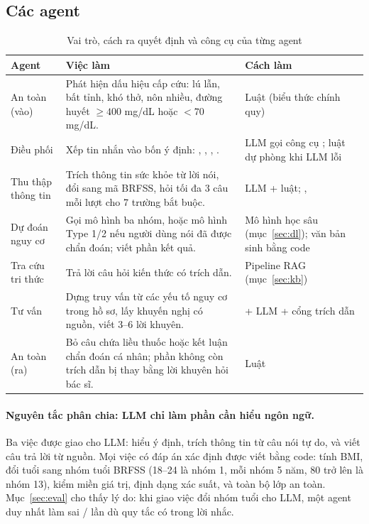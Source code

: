 \documentclass[11pt,a4paper]{article}
\begin{document}
\subsection{Các agent}

\begin{table}[H]
\centering
\caption{Vai trò, cách ra quyết định và công cụ của từng agent}
\begin{tabularx}{\linewidth}{L{2.4cm}YL{3.4cm}}
\toprule
Agent & Việc làm & Cách làm \\
\midrule
An toàn (vào) & Phát hiện dấu hiệu cấp cứu: lú lẫn, bất tỉnh, khó thở, nôn nhiều, đường huyết $\geq 400$ mg/dL hoặc $< 70$ mg/dL. & Luật (biểu thức chính quy) \\
Điều phối & Xếp tin nhắn vào bốn ý định: , , , . & LLM gọi công cụ ; luật dự phòng khi LLM lỗi \\
Thu thập thông tin & Trích thông tin sức khỏe từ lời nói, đổi sang mã BRFSS, hỏi tối đa 3 câu mỗi lượt cho 7 trường bắt buộc. & LLM  + luật; ,  \\
Dự đoán nguy cơ & Gọi mô hình ba nhóm, hoặc mô hình Type 1/2 nếu người dùng nói đã được chẩn đoán; viết phần kết quả. & Mô hình học sâu (mục~\ref{sec:dl}); văn bản sinh bằng code \\
Tra cứu tri thức & Trả lời câu hỏi kiến thức có trích dẫn. & Pipeline RAG (mục~\ref{sec:kb}) \\
Tư vấn & Dựng truy vấn từ các yếu tố nguy cơ trong hồ sơ, lấy khuyến nghị có nguồn, viết 3--6 lời khuyên. &  + LLM + cổng trích dẫn \\
An toàn (ra) & Bỏ câu chứa liều thuốc hoặc kết luận chẩn đoán cá nhân; phần không còn trích dẫn bị thay bằng lời khuyên hỏi bác sĩ. & Luật \\
\bottomrule
\end{tabularx}
\end{table}

\paragraph{Nguyên tắc phân chia: LLM chỉ làm phần cần hiểu ngôn ngữ.}
Ba việc được giao cho LLM: hiểu ý định, trích thông tin từ câu nói tự do, và viết câu trả lời từ nguồn. Mọi việc có đáp án
xác định được viết bằng code: tính BMI, đổi tuổi sang nhóm tuổi BRFSS (18--24 là nhóm 1, mỗi nhóm 5 năm, 80 trở lên là
nhóm 13), kiểm miền giá trị, định dạng xác suất, và toàn bộ lớp an toàn. Mục~\ref{sec:eval} cho thấy lý do: khi giao việc đổi
nhóm tuổi cho LLM, một agent duy nhất làm sai \saAgeErr/\convN{} lần dù quy tắc có trong lời nhắc.
\end{document}
